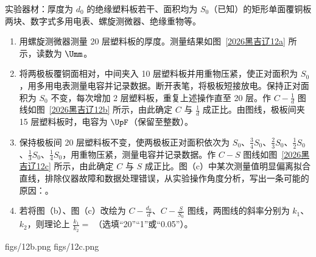 \documentclass[\gkver]{gaokaozhenti}
\begin{document}
\begin{enumerate}
实验器材：厚度为 $d_{0}$ 的绝缘塑料板若干、面积均为 $S_{0}$（已知）的矩形单面覆铜板两块、数字式多用电表、螺旋测微器、绝缘重物等。
\begin{enumerate}
	\item
	用螺旋测微器测量 20 层塑料板的厚度。测量结果如图~\ref{2026黑吉辽12a} 所示，读数为  $\Umm$。

	\item
	将两极板覆铜面相对，中间夹入 10 层塑料板并用重物压紧，使正对面积为 $S_{0}$，用多用电表测量电容并记录数据。断开表笔，将极板短接放电。保持正对面积为 $S_{0}$ 不变，每次增加 2 层塑料板，重复上述操作直至 20 层。作 $C-\frac{1}{d}$ 图线如图~\ref{2026黑吉辽12b} 所示，由此确定 $C$ 与 $\frac{1}{d}$ 成正比。由图线，极板间夹 15 层塑料板时，电容为  $\UpF$（保留至整数）。

	\item
	保持极板间 20 层塑料板不变，使两极板正对面积依次为 $S_{0}$、$\frac{3}{4}S_{0}$、$\frac{2}{3}S_{0}$、$\frac{1}{2}S_{0}$、$\frac{1}{3}S_{0}$、$\frac{1}{4}S_{0}$，用重物压紧，测量电容并记录数据。作 $C-S$ 图线如图~\ref{2026黑吉辽12c} 所示，由此确定 $C$ 与 $S$ 成正比。图（c）中某次测量值明显偏离拟合直线，排除仪器故障和数据处理错误，从实验操作角度分析，写出一条可能的原因：。

	\item
	若将图（b）、图（c）改绘为 $C-\frac{d_{0}}{d}$、$C-\frac{S}{S_{0}}$ 图线，两图线的斜率分别为 $k_{1}$、$k_{2}$，则理论上 $\frac{k_{1}}{k_{2}}=$ （选填“20”“1”或“0.05”）。
\end{enumerate}
{figs/12b.png}
{figs/12c.png}

\end{enumerate}
\end{document}
